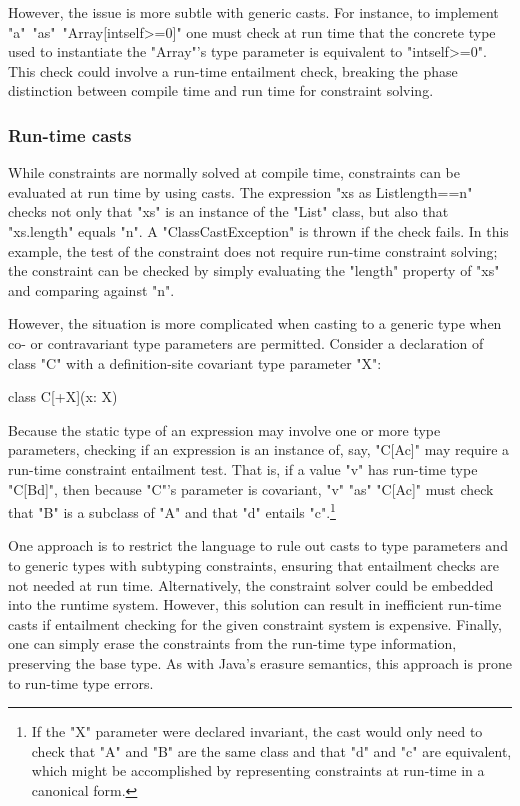 However, the issue is more subtle with generic casts.
For instance, to implement
\xcd"a"~\xcd"as"~\xcd"Array[int{self>=0}]"
one must check at run time that the concrete type used to instantiate
the \xcd"Array"'s type parameter is equivalent to
\xcd"int{self>=0}".  This check could involve a run-time
entailment check, 
breaking the phase distinction between
compile time and run time for constraint solving.

\subsubsection{Run-time casts}
\label{sec:casts}

While constraints are normally solved at compile time, 
constraints can be evaluated at run time by using casts.
The expression 
\xcd"xs as List{length==n}" checks not only 
that \xcd"xs"
is an instance of
the \xcd"List" class, but also that \xcd"xs.length" equals \xcd"n".
A \xcd"ClassCastException" is thrown if the check fails.
%
In this example, the test of the constraint does not require
run-time constraint
solving; the constraint can be checked by simply
evaluating the \xcd"length" property of \xcd"xs" and comparing against \xcd"n".

However, the situation is more complicated when casting to a
generic type when co- or contravariant
type parameters are permitted.  Consider a declaration of class
\xcd"C" with a definition-site covariant type parameter \xcd"X":
\begin{xtenmath}
class C[+X](x: X) { }
\end{xtenmath}
\noindent
Because the static type of an expression may involve one or more
type parameters,
checking if an expression is an instance of, say, \xcd"C[A{c}]"
may require a run-time constraint entailment test.  That is,
if a value \xcd"v"
has run-time type \xcd"C[B{d}]", then because \xcd"C"'s
parameter is covariant,
\xcd"v" \xcd"as" \xcd"C[A{c}]" must check that \xcd"B" is a subclass of
\xcd"A" and that \xcd"d" entails \xcd"c".\footnote{If the
\xcd"X" parameter were declared invariant, the cast would only
need to check that \xcd"A" and \xcd"B" are the same class and
that \xcd"d" and \xcd"c" are equivalent, which might be
accomplished by representing constraints at run-time in a
canonical form.}

One approach is to restrict the language 
to rule out casts to type parameters 
and to generic types with subtyping constraints, ensuring that
entailment checks are not needed at run time.
Alternatively, 
the constraint solver could be embedded into the runtime system.
However, this
solution can result in inefficient run-time casts
if entailment checking for the given constraint system is expensive.
Finally, one can simply erase the constraints from the run-time
type information, preserving the base type.  As with Java's
erasure semantics, this approach is prone to run-time type
errors.

